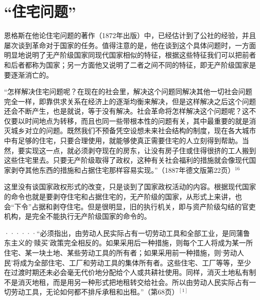 \chapter{“住宅问题”} %

恩格斯在他论住宅问题的著作（1872年出版）中，已经估计到了公社的经验，并且屡次谈到革命对于国家的任务。值得注意的是，他在谈到这个具体问题时，一方面明显地说明了无产阶级国家同现代国家相似的特征，根据这些特征我们可以把前者和后者都称为国家；另一方面他又说明了二者之间不同的特征，即无产阶级国家是要逐渐消亡的。

\pskip
\leftskip=10mm
\small

“怎样解决住宅问题呢？在现在的社会里，解决这个问题同解决其他一切社会问题完全一样，即靠供求关系在经济上的逐渐均衡来解决，但是这样解决之后这个问题还会不断产生，也是就说，等于没有解决。社会革命将怎样解决这个问题呢？这不仅要以时间地点为转移，而且也同一些带根本性的问题有关，其中最重要的就是消灭城乡对立的问题。既然我们不预备凭空设想未来社会结构的制度，现在各大城市中有足够的住宅，只要合理使用，就能够使真正{\kaishu 需要}住宅的人立刻得到帮助。当然，要实现这一点，就必须剥夺现在的房东，让没有房子住或住得很挤的工人搬到这些住宅里去。只要无产阶级取得了政权，这种有关社会福利的措施就会像现代国家剥夺其他东西的措施和占据住宅那样容易实现。”（1887年德文版第22页）$^{16}$

\normalsize
\leftskip=0mm
\pskip

这里没有谈国家政权形式的改变，只是谈到了国家政权活动的内容。根据现代国家的命令也就是要剥夺住宅和占据住宅的，无产阶级的国家，从形式上来讲，也会“下令”占据和剥夺住宅。但是很明显，旧的执行机关，即与资产阶级勾结的官吏机构，是完全不能执行无产阶级国家的命令的。

\pskip
\leftskip=10mm
\small

······“必须指出，由劳动人民实际占有一切劳动工具和全部工业，是同蒲鲁东主义的‘赎买’政策完全相反的。如果采用后一种措施，则每个工人将成为某一所住宅、某一块土地、某些劳动工具的所有者；如果采用前一种措施，则‘劳动人民’将成为全部住宅、工厂和劳动工具的集体所有者。这些住宅、工厂等等，至少在过渡时期还未必会毫无代价地分配给个人或共耕社使用。同样，消灭土地私有制不是消灭地租，而是用另一种形式把地租转交给社会。所以由劳动人民实际占有一切劳动工具，无论如何都不排斥承租和出租。”（第68页）$^{[1]}$

\normalsize
\leftskip=0mm
\pskip

